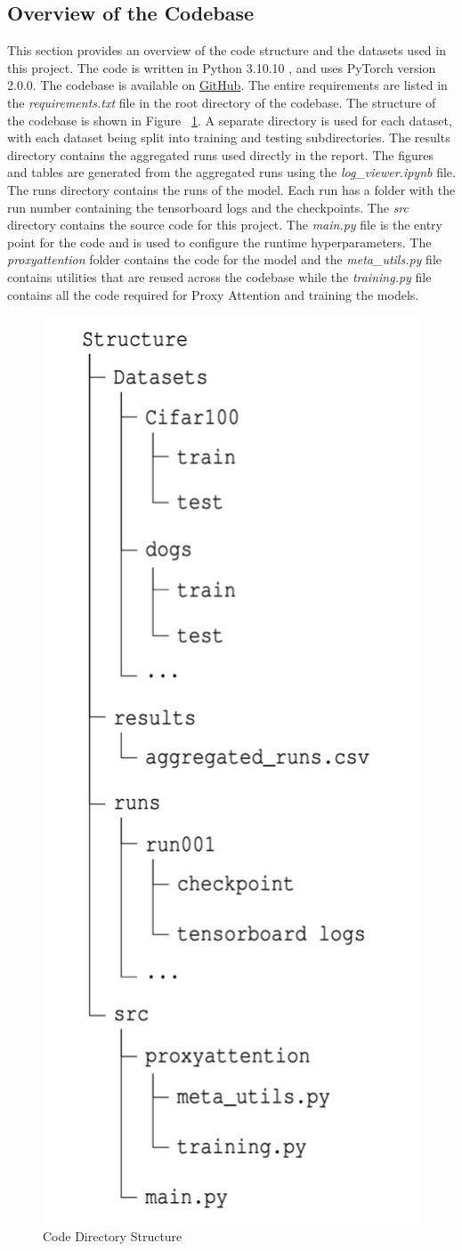 \documentclass[a4paper,11pt,openright]{book}
\begin{document}
\subsection{Overview of the Codebase}
This section provides an overview of the code structure and the datasets used in this project. The code is written in Python 3.10.10 , and uses PyTorch version 2.0.0. The codebase is available on \href{https://github.com/SubhadityaMukherjee/proxy_attention}{GitHub}.  The entire requirements are listed in the \textit{requirements.txt} file in the root directory of the codebase. The structure of the codebase is shown in Figure ~\ref{fig:overview_code}.
A separate directory is used for each dataset, with each dataset being split into training and testing subdirectories. The results directory contains the aggregated runs used directly in the report. The figures and tables are generated from the aggregated runs using the \textit{log\_viewer.ipynb} file. The runs directory contains the runs of the model. Each run has a folder with the run number containing the tensorboard logs and the checkpoints. 
The \textit{src} directory contains the source code for this project. The \textit{main.py} file is the entry point for the code and is used to configure the runtime hyperparameters. The \textit{proxyattention} folder contains the code for the model and the \textit{meta\_utils.py} file contains utilities that are reused across the codebase while the \textit{training.py} file contains all the code required for Proxy Attention and training the models.

\begin{figure}[!htb]
    \centering
    \includegraphics[width=.3\linewidth]{images/dirstruct.png}
    \caption{Code Directory Structure}
    \label{fig:overview_code}
\end{figure}
\end{document}
